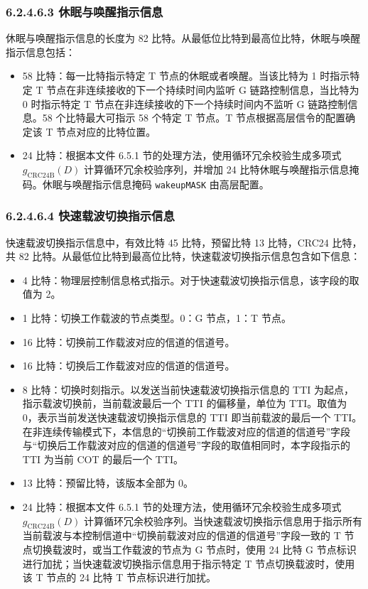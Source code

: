 \documentclass[11pt,a4paper]{ctexart}
\begin{document}
\subsubsection{6.2.4.6.3 休眠与唤醒指示信息}

休眠与唤醒指示信息的长度为 82 比特。从最低位比特到最高位比特，休眠与唤醒指示信息包括：
\begin{itemize}[nosep]
  \item 58 比特：每一比特指示特定 T 节点的休眠或者唤醒。当该比特为 1 时指示特定 T 节点在非连续接收的下一个持续时间内监听 G 链路控制信息，当比特为 0 时指示特定 T 节点在非连续接收的下一个持续时间内不监听 G 链路控制信息。58 个比特最大可指示 58 个特定 T 节点。T 节点根据高层信令的配置确定该 T 节点对应的比特位置。
  \item 24 比特：根据本文件 6.5.1 节的处理方法，使用循环冗余校验生成多项式 $g_{\mathrm{CRC24B}}(D)$ 计算循环冗余校验序列，并增加 24 比特休眠与唤醒指示信息掩码。休眠与唤醒指示信息掩码 \texttt{wakeupMASK} 由高层配置。
\end{itemize}

\subsubsection{6.2.4.6.4 快速载波切换指示信息}

快速载波切换指示信息中，有效比特 45 比特，预留比特 13 比特，CRC24 比特，共 82 比特。从最低位比特到最高位比特，快速载波切换指示信息包含如下信息：
\begin{itemize}[nosep]
  \item 4 比特：物理层控制信息格式指示。对于快速载波切换指示信息，该字段的取值为 2。
  \item 1 比特：切换工作载波的节点类型。0：G 节点，1：T 节点。
  \item 16 比特：切换前工作载波对应的信道的信道号。
  \item 16 比特：切换后工作载波对应的信道的信道号。
  \item 8 比特：切换时刻指示。以发送当前快速载波切换指示信息的 TTI 为起点，指示载波切换前，当前载波最后一个 TTI 的偏移量，单位为 TTI。取值为 0，表示当前发送快速载波切换指示信息的 TTI 即当前载波的最后一个 TTI。在非连续传输模式下，本信息的``切换前工作载波对应的信道的信道号''字段与``切换后工作载波对应的信道的信道号''字段的取值相同时，本字段指示的 TTI 为当前 COT 的最后一个 TTI。
  \item 13 比特：预留比特，该版本全部为 0。
  \item 24 比特：根据本文件 6.5.1 节的处理方法，使用循环冗余校验生成多项式 $g_{\mathrm{CRC24B}}(D)$ 计算循环冗余校验序列。当快速载波切换指示信息用于指示所有当前载波与本控制信道中``切换前载波对应的信道的信道号''字段一致的 T 节点切换载波时，或当工作载波的节点为 G 节点时，使用 24 比特 G 节点标识进行加扰；当快速载波切换指示信息用于指示特定 T 节点切换载波时，使用该 T 节点的 24 比特 T 节点标识进行加扰。
\end{itemize}
\end{document}
